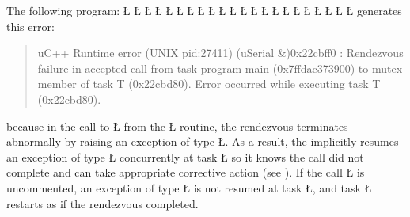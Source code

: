 \documentclass[openright,twoside]{report}
\begin{document}
The following program:
\LGinlinefalse\LGbegin\lgrinde
\L{}
\L{\LB{}}
\L{}
\L{\LB{}}
\L{}
\L{\LB{}}
\L{\LB{}}
\L{\LB{\C{}\1\1}}
\CE{}\L{\LB{}}
\L{\LB{}}
\L{}
\L{\LB{}}
\L{\LB{}}
\L{\LB{}}
\L{\LB{\};}}
\endlgrinde\LGend
\LGinlinefalse\LGbegin\lgrinde
\L{}
\L{\LB{}}
\L{\LB{}}
\L{\LB{}}
\L{\LB{}}
\L{\LB{}}
\L{\LB{\}}}
\endlgrinde\LGend
generates this error:
\begin{quote}
\BGfont
uC++ Runtime error (UNIX pid:27411) (uSerial \&)0x22cbff0 : Rendezvous failure in accepted call from task program main (0x7ffdac373900) to mutex member of task T (0x22cbd80).
Error occurred while executing task T (0x22cbd80).
\end{quote}
because in the call to \LGinlinetrue\LGbegin\lgrinde\L{}\endlgrinde\LGend{} from the \LGinlinetrue\LGbegin\lgrinde\L{}\endlgrinde\LGend{} routine, the rendezvous terminates abnormally by raising an exception of type \LGinlinetrue\LGbegin\lgrinde\L{}\endlgrinde\LGend{}.
As a result, the  implicitly resumes an exception of type \LGinlinetrue\LGbegin\lgrinde\L{}\endlgrinde\LGend{} concurrently at task \LGinlinetrue\LGbegin\lgrinde\L{}\endlgrinde\LGend{} so it knows the call did not complete and can take appropriate corrective action (see ).
If the call \LGinlinetrue\LGbegin\lgrinde\L{}\endlgrinde\LGend{} is uncommented, an exception of type \LGinlinetrue\LGbegin\lgrinde\L{}\endlgrinde\LGend{} is not resumed at task \LGinlinetrue\LGbegin\lgrinde\L{}\endlgrinde\LGend{}, and task \LGinlinetrue\LGbegin\lgrinde\L{}\endlgrinde\LGend{} restarts as if the rendezvous completed.
\end{document}
